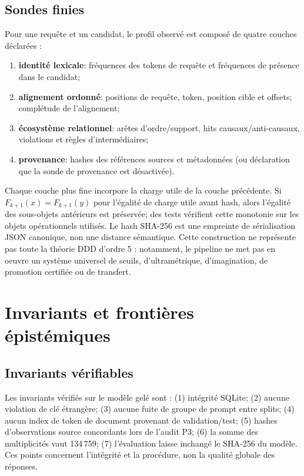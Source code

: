 \documentclass[11pt,a4paper,openany]{book}
\begin{document}
\section{Sondes finies}
Pour une requête et un candidat, le profil observé est composé de quatre couches déclarées :
\begin{enumerate}[label=\arabic*.]
\item \textbf{identité lexicale}: fréquences des tokens de requête et fréquences de présence dans le candidat;
\item \textbf{alignement ordonné}: positions de requête, token, position cible et offsets; complétude de l'alignement;
\item \textbf{écosystème relationnel}: arêtes d'ordre/support, hits causaux/anti-causaux, violations et règles d'intermédiaires;
\item \textbf{provenance}: hashes des références sources et métadonnées (ou déclaration que la sonde de provenance est désactivée).
\end{enumerate}
Chaque couche plus fine incorpore la charge utile de la couche précédente. Si $F_{k+1}(x)=F_{k+1}(y)$ pour l'égalité de charge utile avant hash, alors l'égalité des sous-objets antérieurs est préservée; des tests vérifient cette monotonie sur les objets opérationnels utilisés. Le hash SHA-256 est une empreinte de sérialisation JSON canonique, non une distance sémantique. Cette construction ne représente pas toute la théorie DDD d'ordre 5 : notamment, le pipeline ne met pas en oeuvre un système universel de seuils, d'ultramétrique, d'imagination, de promotion certifiée ou de transfert.

\chapter{Invariants et frontières épistémiques}
\section{Invariants vérifiables}
Les invariants vérifiés sur le modèle gelé sont : (1) intégrité SQLite; (2) aucune violation de clé étrangère; (3) aucune fuite de groupe de prompt entre splits; (4) aucun index de token de document provenant de validation/test; (5) hashes d'observations source concordants lors de l'audit P3; (6) la somme des multiplicités vaut 134\,759; (7) l'évaluation laisse inchangé le SHA-256 du modèle. Ces points concernent l'intégrité et la procédure, non la qualité globale des réponses.
\end{document}
